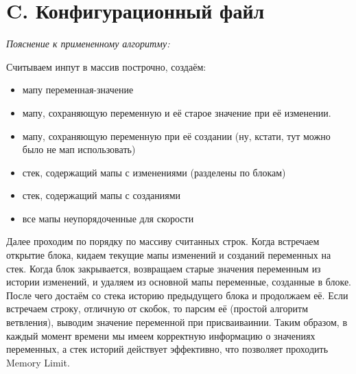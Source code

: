 \section{C. Конфигурационный файл}
\textit{Пояснение к примененному алгоритму:} \par
Считываем инпут в массив построчно, создаём:
\begin{itemize}
    \item мапу переменная-значение
    \item мапу, сохраняющую переменную и её старое значение при её изменении.
    \item мапу, сохраняющую переменную при её создании (ну, кстати, тут можно было не мап использовать)
    \item стек, содержащий мапы с изменениями (разделены по блокам)
    \item стек, содержащий мапы с созданиями
    \item все мапы неупорядоченные для скорости
\end{itemize}
Далее проходим по порядку по массиву считанных строк. Когда встречаем открытие блока, кидаем текущие мапы изменений и созданий переменных на стек. Когда блок закрывается, возвращаем старые значения переменным из истории изменений, и удаляем из основной мапы переменные, созданные в блоке. После чего достаём со стека историю предыдущего блока и продолжаем её.
Если встречаем строку, отличную от скобок, то парсим её (простой алгоритм ветвления), выводим значение переменной при присваиваинии.
Таким образом, в каждый момент времени мы имеем корректную информацию о значениях переменных, а стек историй действует эффективно, что позволяет проходить Memory Limit.
\BgThispage
\newpage
\tiny
